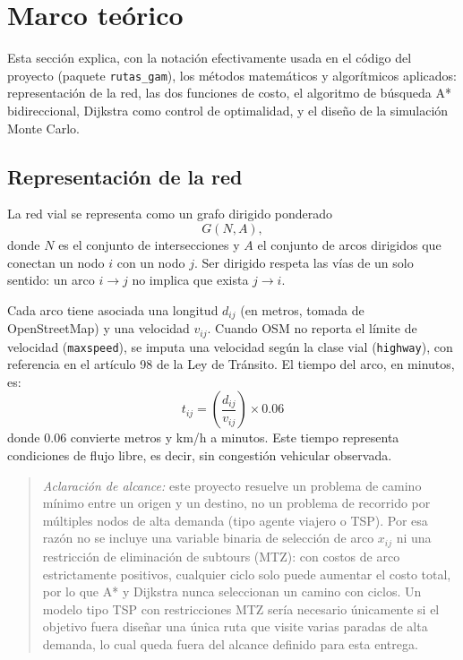 \documentclass[11pt]{article}
\numberwithin{equation}{section}
\begin{document}
\section{Marco teórico}\label{sec:marco}

Esta sección explica, con la notación efectivamente usada en el código del proyecto (paquete \nolinkurl{rutas_gam}), los métodos matemáticos y algorítmicos aplicados: representación de la red, las dos funciones de costo, el algoritmo de búsqueda A* bidireccional, Dijkstra como control de optimalidad, y el diseño de la simulación Monte Carlo.

\subsection{Representación de la red}

La red vial se representa como un grafo dirigido ponderado
\begin{equation}
    G(N, A),
\end{equation}
donde $N$ es el conjunto de intersecciones y $A$ el conjunto de arcos dirigidos que conectan un nodo $i$ con un nodo $j$. Ser dirigido respeta las vías de un solo sentido: un arco $i \to j$ no implica que exista $j \to i$.

Cada arco tiene asociada una longitud $d_{ij}$ (en metros, tomada de OpenStreetMap) y una velocidad $v_{ij}$. Cuando OSM no reporta el límite de velocidad (\texttt{maxspeed}), se imputa una velocidad según la clase vial (\texttt{highway}), con referencia en el artículo 98 de la Ley de Tránsito. El tiempo del arco, en minutos, es:
\begin{equation}
    t_{ij} = \left(\frac{d_{ij}}{v_{ij}}\right) \times 0.06
    \label{eq:tiempo_arco}
\end{equation}
donde $0.06$ convierte metros y km/h a minutos. Este tiempo representa condiciones de flujo libre, es decir, sin congestión vehicular observada.

\begin{quote}
\textit{Aclaración de alcance:} este proyecto resuelve un problema de camino mínimo entre un origen y un destino, no un problema de recorrido por múltiples nodos de alta demanda (tipo agente viajero o TSP). Por esa razón no se incluye una variable binaria de selección de arco $x_{ij}$ ni una restricción de eliminación de subtours (MTZ): con costos de arco estrictamente positivos, cualquier ciclo solo puede aumentar el costo total, por lo que A* y Dijkstra nunca seleccionan un camino con ciclos. Un modelo tipo TSP con restricciones MTZ sería necesario únicamente si el objetivo fuera diseñar una única ruta que visite varias paradas de alta demanda, lo cual queda fuera del alcance definido para esta entrega.
\end{quote}
\end{document}
